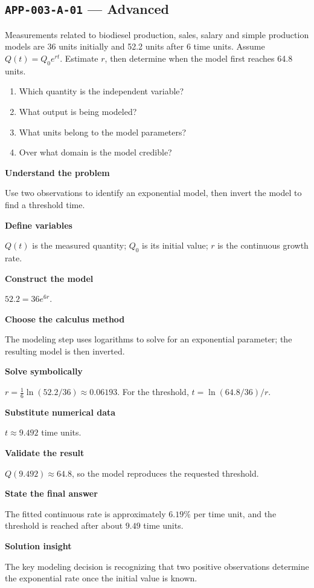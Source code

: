\documentclass[11pt]{book}
\newcommand{\pid}[1]{\texttt{#1}}
\begin{document}
\subsection*{\pid{APP-003-A-01} — Advanced}
\begin{problembox}
Measurements related to biodiesel production, sales, salary and simple production models are 36 units initially and 52.2 units after 6 time units. Assume $Q(t)=Q_0e^{rt}$. Estimate $r$, then determine when the model first reaches 64.8 units.
\end{problembox}
\begin{promptbox}\begin{enumerate}
\item Which quantity is the independent variable?
\item What output is being modeled?
\item What units belong to the model parameters?
\item Over what domain is the model credible?
\end{enumerate}\end{promptbox}
\begin{solutionbox}
\textbf{Understand the problem}\par Use two observations to identify an exponential model, then invert the model to find a threshold time.\par\medskip
\textbf{Define variables}\par $Q(t)$ is the measured quantity; $Q_0$ is its initial value; $r$ is the continuous growth rate.\par\medskip
\textbf{Construct the model}\par $52.2=36e^{6r}$.\par\medskip
\textbf{Choose the calculus method}\par The modeling step uses logarithms to solve for an exponential parameter; the resulting model is then inverted.\par\medskip
\textbf{Solve symbolically}\par $r=\frac1{6}\ln(52.2/36)\approx 0.06193$. For the threshold, $t=\ln(64.8/36)/r$.\par\medskip
\textbf{Substitute numerical data}\par $t\approx 9.492$ time units.\par\medskip
\textbf{Validate the result}\par $Q(9.492)\approx 64.8$, so the model reproduces the requested threshold.\par\medskip
\textbf{State the final answer}\par The fitted continuous rate is approximately $6.19\%$ per time unit, and the threshold is reached after about $9.49$ time units.\par\medskip
\textbf{Solution insight}\par The key modeling decision is recognizing that two positive observations determine the exponential rate once the initial value is known.\par\medskip
\end{solutionbox}
\end{document}

